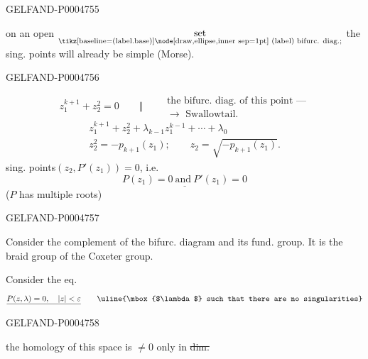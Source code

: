 \begin{GelfandAdjacentEvidence}{GELFAND-P000475}{5}

 on an open
\(\underset{\text{\scriptsize\tikz[baseline=(label.base)]\node[draw,ellipse,inner sep=1pt] (label) {bifurc. diag.};}}{\text{set}}\)
the sing. points will already be simple (Morse).
\end{GelfandAdjacentEvidence}
\begin{GelfandAdjacentEvidence}{GELFAND-P000475}{6}


\[
z_1^{k+1}+z_2^2=0
\qquad\Vert\qquad
\begin{gathered}
\text{the bifurc. diag. of this point —}\\[-.2ex]
\longrightarrow\text{ Swallowtail}.
\end{gathered}
\]
\[
\begin{gathered}
z_1^{k+1}+z_2^2+\lambda_{k-1}z_1^{k-1}+\cdots+\lambda_0\\
z_2^2=-p_{k+1}(z_1);\qquad z_2=\sqrt{-p_{k+1}(z_1)}.
\end{gathered}
\]
sing. points\quad $(z_2,P'(z_1))=0$, i.e.
\[
\underline{P(z_1)=0\ \text{and}\ P'(z_1)=0}
\]
($P$ has multiple roots)
\end{GelfandAdjacentEvidence}
\begin{GelfandAdjacentEvidence}{GELFAND-P000475}{7}


Consider the complement of the bifurc. diagram and its fund. group.
It is the braid group of the Coxeter group.

Consider the eq.
\[
\underline{P(z,\lambda)=0,\quad |z|<\varepsilon}
\qquad\text{\uline{\mbox{$\lambda$} such that there are no singularities}}
\]
\end{GelfandAdjacentEvidence}
\begin{GelfandAdjacentEvidence}{GELFAND-P000475}{8}


the homology of this space is $\ne0$ only in \sout{dim.}
\end{GelfandAdjacentEvidence}
